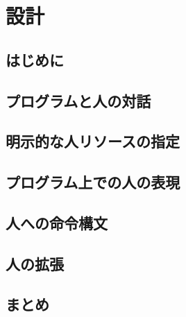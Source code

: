 \chapter{設計}
\label{chap:design}

\section{はじめに}

\section{プログラムと人の対話}

\section{明示的な人リソースの指定}

\section{プログラム上での人の表現}

\section{人への命令構文}

\section{人の拡張}

\section{まとめ}
